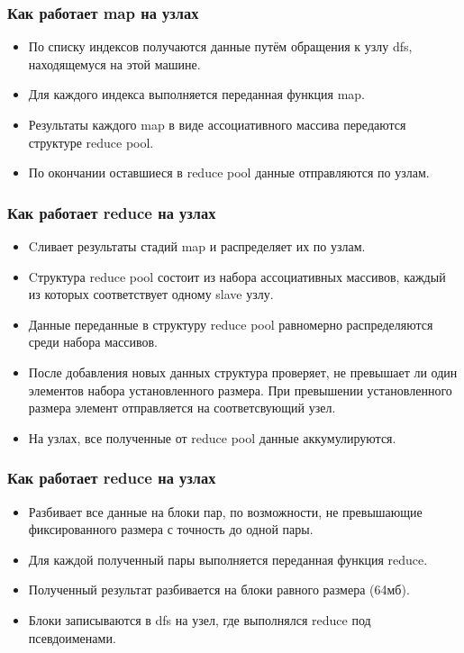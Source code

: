 \documentclass{beamer}
\begin{document}
    \begin{frame}
    \frametitle{Как работает map на узлах}
        \begin{itemize}
            \item По списку индексов получаются данные путём обращения к узлу dfs, находящемуся на этой машине.
            \item Для каждого индекса выполняется переданная функция map.
            \item Результаты каждого map в виде ассоциативного массива передаются структуре reduce pool.
            \item По окончании оставшиеся в reduce pool данные отправляются по узлам.
        \end{itemize}        
    \end{frame}

    \begin{frame}
    \frametitle{Как работает reduce на узлах}

        \begin{itemize}
            \item Cливает результаты стадий map и распределяет их по узлам.
            \item Cтруктура reduce pool состоит из набора ассоциативных массивов, каждый из которых соответствует одному slave узлу.
            \item Данные переданные в структуру reduce pool равномерно распределяются среди набора массивов.
            \item После добавления новых данных структура проверяет, не превышает ли один элементов набора установленного размера. При превышении установленного размера элемент отправляется на соответсвующий узел. 
            \item На узлах, все полученные от reduce pool данные аккумулируются.
        \end{itemize}        
    \end{frame}


    \begin{frame}
    \frametitle{Как работает reduce на узлах}
        \begin{itemize}
            \item Разбивает все данные на блоки пар, по возможности, не превышающие фиксированного размера с точность до одной пары.
            \item Для каждой полученный пары выполняется переданная функция reduce.
            \item Полученный результат разбивается на блоки равного размера (64мб).
            \item Блоки записываются в dfs на узел, где выполнялся reduce под псевдоименами.
        \end{itemize}        
    \end{frame}
\end{document}
